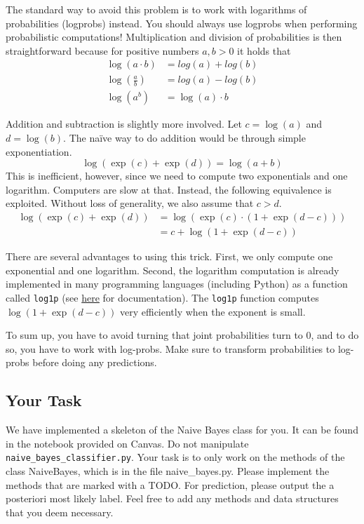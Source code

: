 \documentclass[11pt, a4paper]{article}
\begin{document}
The standard way to avoid this problem is to work with logarithms of probabilities (logprobs) instead. You should always use logprobs when performing
probabilistic computations! Multiplication and division of probabilities is then straightforward because for positive numbers $ a,b > 0 $ it holds that
\begin{align*}
\log(a \cdot b) &= log(a) + log(b) \\
\log\left( \frac{a}{b} \right) &= log(a) - log(b) \\
\log\left( a^{b} \right) &= \log(a) \cdot b
\end{align*}

Addition and subtraction is slightly more involved. Let $ c = \log(a) $ and $ d = \log(b) $. The na\"ive way to do addition would be through simple exponentiation.
\begin{equation*}
\log(\exp(c) + \exp(d)) = \log(a + b)
\end{equation*}
This is inefficient, however, since we need to compute two exponentials and one logarithm. Computers are slow at that. Instead, the 
following equivalence is exploited. Without loss of generality, we also assume that $ c > d $.
\begin{align*}
\log(\exp(c) + \exp(d)) &= \log(\exp(c) \cdot (1 + \exp(d-c)))  \\
&= c + \log(1 + \exp(d-c)) 
\end{align*}

There are several advantages to using this trick. First, we only compute one exponential and one logarithm. Second, the logarithm computation is already 
implemented in many programming languages (including Python) as a function called \texttt{log1p} (see \href{https://docs.python.org/3/library/math.html}{here} for documentation). The \texttt{log1p} function computes $ \log(1 + \exp(d-c)) $ very efficiently when the exponent is small.

To sum up, you have to avoid turning that joint probabilities turn to 0, and to do so, you have to work with log-probs. Make sure to transform probabilities to log-probs before doing any predictions.

\subsection{Your Task}
We have implemented a skeleton of the Naive Bayes class for you. It can be found in the notebook provided on Canvas. Do not manipulate \texttt{naive\_bayes\_classifier.py}. Your task is to only work on the methods of the class NaiveBayes, which is in the file naive\_bayes.py. Please implement the methods that are marked with a TODO. For prediction, please output the 
a posteriori most likely label. Feel free to add any methods and data structures that you deem necessary.
\end{document}
